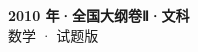 \documentclass[zihao=-4, a4paper]{ctexart}
\begin{document}
\begin{center}
  {\Large\bfseries 2010 年·全国大纲卷Ⅱ·文科}\\[4pt]
  {\large 数学 · 试题版}
\end{center}
\medskip
{}

\end{document}
